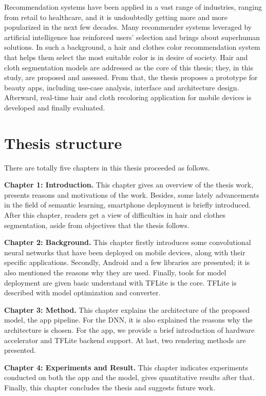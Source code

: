 \label{ch:chap1}
\graphicspath{{./chapter1/image/}}

Recommendation systems have been applied in a vast range of industries, ranging from retail to healthcare, and it is undoubtedly getting more and more popularized in the next few decades. Many recommender systems leveraged by artificial intelligence has reinforced users’ selection and brings about superhuman solutions. In such a background, a hair and clothes color recommendation system that helps them select the most suitable color is in desire of society.  Hair and cloth segmentation models are addressed as the core of this thesis; they, in this study, are proposed and assessed. From that, the thesis proposes a prototype for beauty apps, including use-case analysis, interface and architecture design. Afterward, real-time hair and cloth recoloring application for mobile devices is developed and finally evaluated. \par







\section{Thesis structure}

There are totally five chapters in this thesis proceeded as follows. \par 
\textbf{Chapter 1: Introduction.} This chapter gives an overview of the thesis work, presents reasons and motivations of the work. Besides, some lately advancements in the field of semantic learning, smartphone deployment is briefly introduced. After this chapter, readers get a view of difficulties in hair and clothes segmentation, aside from objectives that the thesis follows.  \par
\textbf{Chapter 2: Background.} This chapter firstly introduces some convolutional neural networks that have been deployed on mobile devices, along with their specific applications. Secondly, Android and a few libraries are presented; it is also mentioned the reasons why they are used. Finally, tools for model deployment are given basic understand with TFLite is the core. TFLite is described with model optimization and converter.  \par
\textbf{Chapter 3: Method.} 
This chapter explains the architecture of the proposed model, the app pipeline. For the DNN, it is also explained the reasons why the architecture is chosen. For the app, we provide a brief introduction of hardware accelerator and TFLite backend support. At last, two rendering methods are presented. \par
\textbf{Chapter 4: Experiments and Result.} This chapter indicates experiments conducted on both the app and the model, gives quantitative results after that. Finally, this chapter concludes the thesis and suggests future work.\par